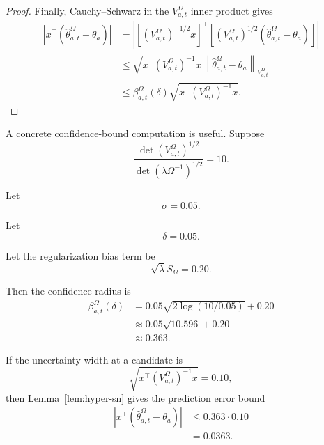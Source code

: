 \documentclass{article} %
\begin{document}
\begin{proof}
Finally, Cauchy--Schwarz in the \(V_{a,t}^{\Omega}\) inner product gives
\begin{align}
\label{eq:hyper-sn-proof-pred}
\left|
x^\top
\left(
\widehat{\theta}_{a,t}^{\Omega}-\theta_a
\right)
\right|
&=
\left|
\left[
\left(V_{a,t}^{\Omega}\right)^{-1/2}x
\right]^\top
\left[
\left(V_{a,t}^{\Omega}\right)^{1/2}
\left(
\widehat{\theta}_{a,t}^{\Omega}-\theta_a
\right)
\right]
\right|
\\
&\le
\sqrt{x^\top\left(V_{a,t}^{\Omega}\right)^{-1}x}
\left\|
\widehat{\theta}_{a,t}^{\Omega}-\theta_a
\right\|_{V_{a,t}^{\Omega}}
\\
&\le
\beta_{a,t}^{\Omega}(\delta)
\sqrt{x^\top\left(V_{a,t}^{\Omega}\right)^{-1}x}.
\end{align}
\end{proof}

A concrete confidence-bound computation is useful.  Suppose
\begin{equation}
\label{eq:hyper-bound-example-det-ratio}
\frac{
\det(V_{a,t}^{\Omega})^{1/2}
}{
\det(\lambda\Omega^{-1})^{1/2}
}
=
10 .
\end{equation}

Let
\begin{equation}
\label{eq:hyper-bound-example-sigma}
\sigma=0.05 .
\end{equation}

Let
\begin{equation}
\label{eq:hyper-bound-example-delta}
\delta=0.05 .
\end{equation}

Let the regularization bias term be
\begin{equation}
\label{eq:hyper-bound-example-bias}
\sqrt{\lambda}S_{\Omega}=0.20 .
\end{equation}

Then the confidence radius is
\begin{align}
\label{eq:hyper-bound-example-beta}
\beta_{a,t}^{\Omega}(\delta)
&=
0.05
\sqrt{
2\log(10/0.05)
}
+
0.20
\\
&\approx
0.05\sqrt{10.596}+0.20
\\
&\approx
0.363 .
\end{align}

If the uncertainty width at a candidate is
\begin{equation}
\label{eq:hyper-bound-example-width}
\sqrt{x^\top(V_{a,t}^{\Omega})^{-1}x}=0.10,
\end{equation}
then Lemma~\ref{lem:hyper-sn} gives the prediction error bound
\begin{align}
\label{eq:hyper-bound-example-pred}
\left|
x^\top
\left(
\widehat{\theta}_{a,t}^{\Omega}-\theta_a
\right)
\right|
&\le
0.363\cdot 0.10
\\
&=
0.0363 .
\end{align}
\end{document}
